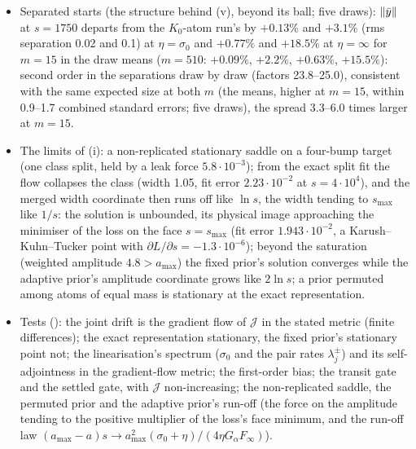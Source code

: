 \begin{itemize}
    $\norm{\bar y}$ $4.9\cdot10^{-3}$--$3.7\cdot10^{-2}$ at $\eta=\sigma_0$ against the $K_0$-atom run's
    $1.3\cdot10^{-3}$. Settled gate (opens at $s=1211$--$1304$, the systems replicated: rms separations
    $\le7.9\cdot10^{-4}$): $\norm{\bar y}$ and the fit error equal to the $K_0$-atom run's at $s-t_{\mathrm{open}}$ for
    every $m$ (per-seed ratios 0.995--1.000 at $\eta=\sigma_0$, 0.968--1.001 at $\eta=\infty$: the invariance of the
    replicated configurations); fit errors $1.6\cdot10^{-4}$ and $3.4$--$3.5\cdot10^{-5}$, $W^2$
    $6.7$--$7.2\cdot10^{-6}$ and $9.3$--$9.9\cdot10^{-7}$; in the seed means the settled gate is the lower except the
    fit error at $\eta=\sigma_0$ and $m=510$ ($1.64\cdot10^{-4}$ against the transit gate's $1.55\cdot10^{-4}$), and
    system by system the transit gate ends lower in all three of $\norm{\bar y}$, $W^2$ and the fit error in 6 of 32.
  \item Separated starts (the structure behind (v), beyond its ball; five draws): $\norm{\bar y}$ at $s=1750$ departs
    from the $K_0$-atom run's by $+0.13\%$ and $+3.1\%$ (rms separation 0.02 and 0.1) at $\eta=\sigma_0$ and
    $+0.77\%$ and $+18.5\%$ at $\eta=\infty$ for $m=15$ in the draw means ($m=510$: $+0.09\%$, $+2.2\%$, $+0.63\%$,
    $+15.5\%$): second order in the separations draw by draw (factors 23.8--25.0), consistent with the same expected
    size at both $m$ (the means, higher at $m=15$, within 0.9--1.7 combined standard errors; five draws), the spread
    3.3--6.0 times larger at $m=15$.
  \item The limits of (i): a non-replicated stationary saddle on a four-bump target (one class split, held by a leak
    force $5.8\cdot10^{-3}$); from the exact split fit the flow collapses the class (width 1.05, fit error
    $2.23\cdot10^{-2}$ at $s=4\cdot10^4$), and the merged width coordinate then runs off like $\ln s$, the width tending
    to $s_{\max}$ like $1/s$: the solution is unbounded, its physical image approaching the minimiser of the loss on the
    face $s=s_{\max}$ (fit error $1.943\cdot10^{-2}$, a Karush--Kuhn--Tucker point with
    $\partial L/\partial s=-1.3\cdot10^{-6}$); beyond the saturation (weighted amplitude $4.8>a_{\max}$) the fixed
    prior's solution converges while the adaptive prior's amplitude coordinate grows like $2\ln s$; a prior permuted
    among atoms of equal mass is stationary at the exact representation.
  \item Tests (): the joint drift is the gradient flow of $\mathcal{J}$ in the
    stated metric (finite differences); the exact representation stationary, the fixed prior's stationary point not;
    the linearisation's spectrum ($\sigma_0$ and the pair rates $\lambda_j^\pm$) and its self-adjointness in the
    gradient-flow metric; the first-order bias; the transit gate and the settled gate, with $\mathcal{J}$
    non-increasing; the non-replicated saddle, the permuted prior and the adaptive prior's run-off (the force on the
    amplitude tending to the positive multiplier of the loss's face minimum, and the run-off law
    $(a_{\max}-a)s\to a_{\max}^2(\sigma_0+\eta)/(4\eta G_\alpha F_\infty)$).
\end{itemize}


